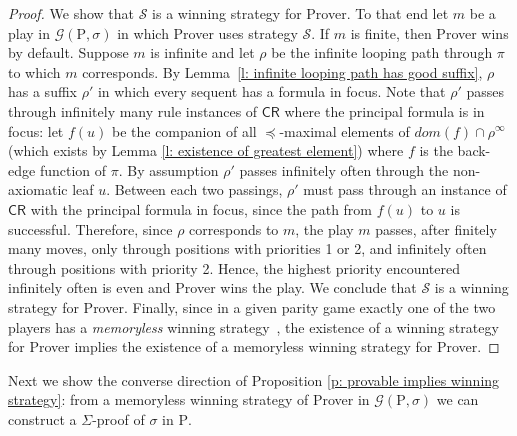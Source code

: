 \documentclass{myifcolog}
\newcommand\C {C}
\newcommand{\hickp}{\mathrm{P}}
\numberwithin{theorem}{section}
\begin{document}
\begin{proof}
	 We show that $\mathcal{S}$ is a winning strategy for Prover. To that end let $m$ be a play in $\mathscr{G}(\hickp,\sigma)$ in which Prover uses strategy $\mathcal{S}$. If $m$ is finite, then Prover wins by default. Suppose $m$ is infinite and let $\rho$ be the infinite looping path through $\pi$ to which $m$ corresponds. By Lemma~\ref{l: infinite looping path has good suffix}, $\rho$ has a suffix $\rho'$ in which every sequent has a formula in focus. Note that $\rho'$ passes through infinitely many rule instances of $\mathsf{\C R}$ where the principal formula is in focus: let $f(u)$ be the companion of all $\preceq$-maximal elements of $dom(f) \cap \rho^{\infty}$ (which exists by Lemma \ref{l: existence of greatest element}) where $f$ is the back-edge function of $\pi$. By assumption $\rho'$ passes infinitely often through the non-axiomatic leaf $u$. Between each two passings, $\rho'$ must pass through an instance of $\mathsf{\C R}$ with the principal formula in focus, since the path from $f(u)$ to $u$ is successful. Therefore, since $\rho$ corresponds to $m$, the play $m$ passes, after finitely many moves, only through positions with priorities 1 or 2, and infinitely often through positions with priority 2. Hence, the highest priority encountered infinitely often is even and Prover wins the play. We conclude that $\mathcal{S}$ is a winning strategy for Prover. Finally, since in a given parity game exactly one of the two players has a \emph{memoryless} winning strategy~\cite{graedel_2001}, the existence of a winning strategy for Prover implies the existence of a memoryless winning strategy for Prover.
	 \end{proof}

Next we show the converse direction of Proposition \ref{p: provable implies winning strategy}: from a memoryless winning strategy of Prover in $\mathscr{G}(\hickp, \sigma)$ we can construct a $\Sigma$-proof of $\sigma$ in $\hickp$.
\end{document}
